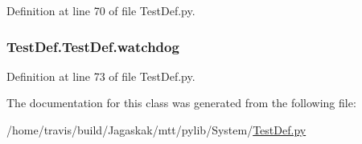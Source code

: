 Definition at line 70 of file Test\-Def.\-py.

\hypertarget{classTestDef_1_1TestDef_a40da46aa95507cffa798cb152fa69e27}{
\subsubsection[{watchdog}]{\setlength{\rightskip}{0pt plus 5cm}Test\-Def.\-Test\-Def.\-watchdog}}\label{classTestDef_1_1TestDef_a40da46aa95507cffa798cb152fa69e27}


Definition at line 73 of file Test\-Def.\-py.



The documentation for this class was generated from the following file\-:\begin{DoxyCompactItemize}
\item 
/home/travis/build/\-Jagaskak/mtt/pylib/\-System/\hyperlink{TestDef_8py}{Test\-Def.\-py}\end{DoxyCompactItemize}
